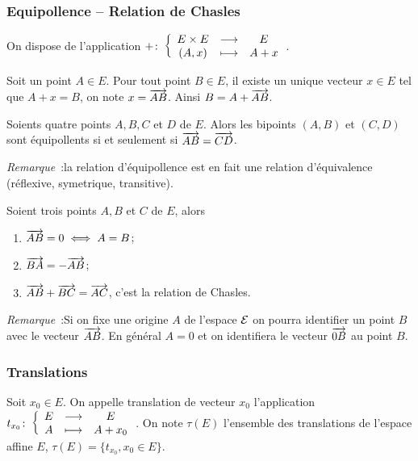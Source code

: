 \subsubsection{Equipollence -- Relation de Chasles}

On dispose de l'application \(+\colon\left\{\begin{array}{ccc}E\times E & \longrightarrow &E\\(A,x) & \longmapsto & A+x\end{array}\right.\).

\begin{defdef}
  Soit un point \(A \in E\). Pour tout point \(B \in E\), il existe un unique 
  vecteur \(x \in E\) tel que \(A+x=B\), on note \(x=\overrightarrow{AB}\). Ainsi 
  \(B=A+\overrightarrow{AB}\).
\end{defdef}
\begin{defdef}
  Soients quatre points \(A,B,C\) et \(D\) de \(E\). Alors les bipoints 
  \((A,B)\) et \((C,D)\) sont équipollents si et seulement si 
  \(\overrightarrow{AB}=\overrightarrow{CD}\).
\end{defdef}

\emph{Remarque}~:la relation d'équipollence est en fait une relation 
d'équivalence (réflexive, symetrique, transitive).

\begin{prop}
  Soient trois points \(A,B\) et \(C\) de \(E\), alors
  \begin{enumerate}
    \item \(\overrightarrow{AB}=0 \iff A=B\);
    \item \(\overrightarrow{BA}=-\overrightarrow{AB}\);
    \item \(\overrightarrow{AB}+\overrightarrow{BC}=\overrightarrow{AC}\), c'est la relation de Chasles.
  \end{enumerate}
\end{prop}

\emph{Remarque}~:Si on fixe une origine \(A\) de l'espace \(\mathcal{E}\) on pourra 
identifier un point \(B\) avec le vecteur \(\overrightarrow{AB}\). En général \(A=0\) et 
on identifiera le vecteur \(\overrightarrow{0B}\) au point \(B\).

\subsubsection{Translations}

\begin{defdef}
  Soit \(x_0 \in E\). On appelle translation de vecteur \(x_0\) l'application 
  \(t_{x_0}\colon\left\{\begin{array}{ccc}E & \longrightarrow &E\\A & \longmapsto & A+x_0\end{array}\right.\). On note \(\tau(E)\) l'ensemble des 
  translations de l'espace affine \(E\), \(\tau(E)=\{t_{x_0}, x_0 \in E\}\).
\end{defdef}

